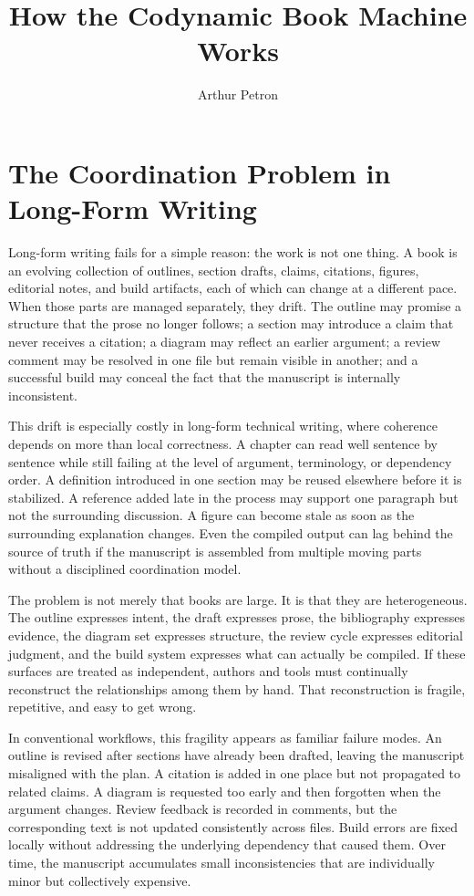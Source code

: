 \documentclass[11pt]{article}
\title{How the Codynamic Book Machine Works}
\author{Arthur Petron}
\begin{document}
\section*{The Coordination Problem in Long-Form Writing}

Long-form writing fails for a simple reason: the work is not one thing. A book is an evolving collection of outlines, section drafts, claims, citations, figures, editorial notes, and build artifacts, each of which can change at a different pace. When those parts are managed separately, they drift. The outline may promise a structure that the prose no longer follows; a section may introduce a claim that never receives a citation; a diagram may reflect an earlier argument; a review comment may be resolved in one file but remain visible in another; and a successful build may conceal the fact that the manuscript is internally inconsistent.

This drift is especially costly in long-form technical writing, where coherence depends on more than local correctness. A chapter can read well sentence by sentence while still failing at the level of argument, terminology, or dependency order. A definition introduced in one section may be reused elsewhere before it is stabilized. A reference added late in the process may support one paragraph but not the surrounding discussion. A figure can become stale as soon as the surrounding explanation changes. Even the compiled output can lag behind the source of truth if the manuscript is assembled from multiple moving parts without a disciplined coordination model.

The problem is not merely that books are large. It is that they are heterogeneous. The outline expresses intent, the draft expresses prose, the bibliography expresses evidence, the diagram set expresses structure, the review cycle expresses editorial judgment, and the build system expresses what can actually be compiled. If these surfaces are treated as independent, authors and tools must continually reconstruct the relationships among them by hand. That reconstruction is fragile, repetitive, and easy to get wrong.

In conventional workflows, this fragility appears as familiar failure modes. An outline is revised after sections have already been drafted, leaving the manuscript misaligned with the plan. A citation is added in one place but not propagated to related claims. A diagram is requested too early and then forgotten when the argument changes. Review feedback is recorded in comments, but the corresponding text is not updated consistently across files. Build errors are fixed locally without addressing the underlying dependency that caused them. Over time, the manuscript accumulates small inconsistencies that are individually minor but collectively expensive.
\end{document}

